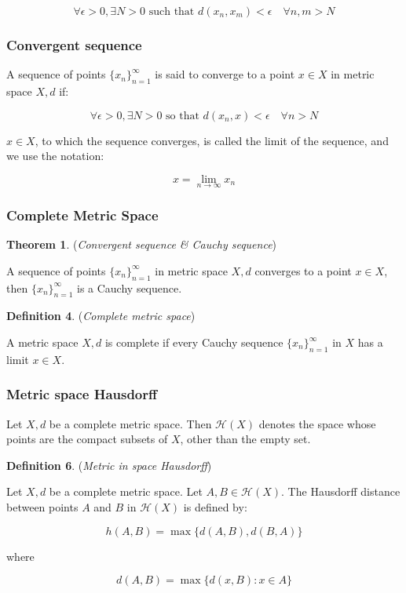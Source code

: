 \[
\forall \epsilon > 0, \exists N > 0 \text{ such that } d(x_n, x_m) < \epsilon \quad \forall n, m > N
\]
\subsubsection{Convergent sequence}

A sequence of points \(\{x_n\}_{n=1}^\infty\) is said to converge to a point \(x \in X\) in metric space \(X, d\) if:

\[
\forall \epsilon > 0, \exists N > 0 \text{ so that } d(x_n, x) < \epsilon \quad \forall n > N
\]

\(x \in X\), to which the sequence converges, is called the limit of the sequence, and we use the notation:

\[
x = \lim_{n \to \infty} x_n
\]

\pagebreak
\subsubsection{Complete Metric Space}

\textbf{Theorem 1}. (\textit{Convergent sequence \& Cauchy sequence})

A sequence of points \(\{x_n\}_{n=1}^\infty\) in metric space \(X, d\) converges to a point \(x \in X\), then \(\{x_n\}_{n=1}^\infty\) is a Cauchy sequence.

\textbf{Definition 4}. (\textit{Complete metric space})

A metric space \(X, d\) is complete if every Cauchy sequence \(\{x_n\}_{n=1}^\infty\) in \(X\) has a limit \(x \in X\).

\subsubsection{Metric space Hausdorff}

Let \(X, d\) be a complete metric space. Then \(\mathcal{H}(X)\) denotes the space whose points are the compact subsets of \(X\), other than the empty set.

\textbf{Definition 6}. (\textit{Metric in space Hausdorff})

Let \(X, d\) be a complete metric space. Let \(A, B \in \mathcal{H}(X)\). The Hausdorff distance between points \(A\) and \(B\) in \(\mathcal{H}(X)\) is defined by:

\[
h(A, B) = \max\{d(A, B), d(B, A)\}
\]

where

\[
d(A, B) = \max\{d(x, B) : x \in A\}
\]

